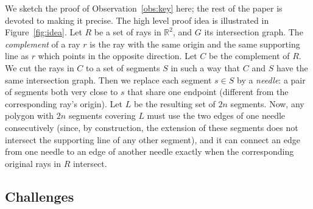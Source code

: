 \documentclass[]{llncs}
\newcommand{\Reals}{{\mathbb{R}}}            %
\begin{document}
We sketch the proof of Observation~\ref {obs:key} here; the rest of the paper is devoted to making it precise.
The high level proof idea is illustrated in Figure~\ref {fig:idea}.
Let $R$ be a set of rays in $\Reals^2$, and $G$ its intersection graph.
The {\em complement} of a ray $r$ is the ray with the same origin and the same supporting line as $r$ which points in the opposite direction.
Let $C$ be the complement of $R$.
We cut the rays in $C$ to a set of segments $S$ in such a way that $C$ and $S$ have the same intersection graph.
Then we replace each segment $s \in S$ by a {\em needle}: a pair of segments both very close to $s$ that share one endpoint (different from the corresponding ray's origin).
Let $L$ be the resulting set of $2n$ segments.
Now, any polygon with $2n$ segments covering $L$ must use the two edges of one needle consecutively (since, by construction, the extension of these segments does not intersect the supporting line of any other segment), and it can connect an edge from one needle to an edge of another needle exactly when the corresponding original rays in $R$ intersect.

\subsection {Challenges}
\end{document}
